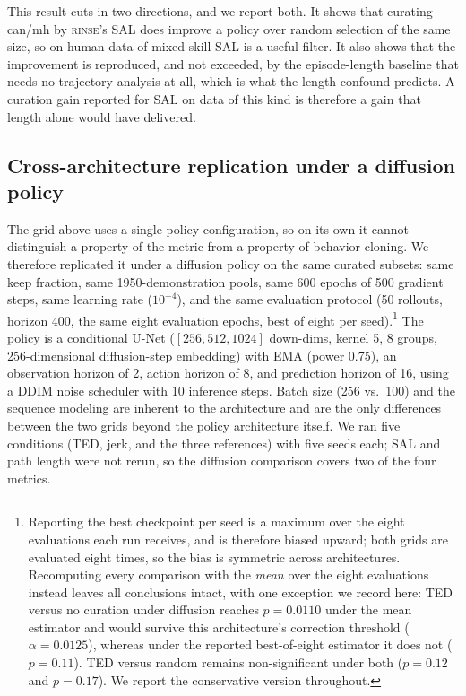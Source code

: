 \documentclass[10pt]{article}
\newcommand{\rinse}{\textmd{\textsc{rinse}}}
\begin{document}
This result cuts in two directions, and we report both. It shows that
curating can/mh by \rinse{}'s SAL does improve a policy over random
selection of the same size, so on human data of mixed skill SAL is a useful
filter. It also shows that the improvement is reproduced, and not
exceeded, by the episode-length baseline that needs no trajectory analysis
at all, which is what the length confound predicts. A curation gain
reported for SAL on data of this kind is therefore a gain that length alone
would have delivered.

\subsection{Cross-architecture replication under a diffusion policy}
\label{sec:crossarch}

The grid above uses a single policy configuration, so on its own it cannot
distinguish a property of the metric from a property of behavior cloning. We
therefore replicated it under a diffusion policy on the same curated
subsets: same keep fraction, same 1950-demonstration pools, same 600 epochs
of 500 gradient steps, same learning rate ($10^{-4}$), and the same
evaluation protocol (50 rollouts, horizon 400, the same eight evaluation epochs, best of eight per seed).\footnote{Reporting the best checkpoint per seed is a
maximum over the eight evaluations each run receives, and is therefore
biased upward; both grids are evaluated eight times, so the bias is
symmetric across architectures. Recomputing every comparison with the
\emph{mean} over the eight evaluations instead leaves all conclusions
intact, with one exception we record here: TED versus no curation under
diffusion reaches $p = 0.0110$ under the mean estimator and would survive
this architecture's correction threshold ($\alpha = 0.0125$), whereas under
the reported best-of-eight estimator it does not ($p = 0.11$). TED versus
random remains non-significant under both ($p = 0.12$ and $p = 0.17$). We
report the conservative version throughout.} The policy is a conditional
U-Net ($[256, 512, 1024]$
down-dims, kernel 5, 8 groups, 256-dimensional diffusion-step embedding)
with EMA (power 0.75), an observation horizon of 2, action horizon of 8, and
prediction horizon of 16, using a DDIM noise scheduler with 10 inference
steps. Batch size (256 vs.\ 100) and the sequence modeling are inherent to
the architecture and are the only differences between the two grids beyond
the policy architecture itself. We ran five conditions (TED, jerk, and the three
references) with five seeds each; SAL and path length were not rerun, so the
diffusion comparison covers two of the four metrics.
\end{document}
